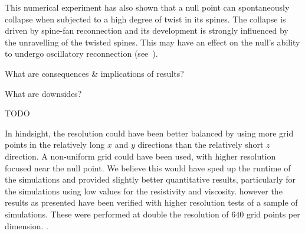 This numerical experiment has also shown that a null point can spontaneously collapse when subjected to a high degree of twist in its spines. The collapse is driven by spine-fan reconnection and its development is strongly influenced by the unravelling of the twisted spines. This may have an effect on the null's ability to undergo oscillatory reconnection (see~\cite{thurgoodThreedimensionalOscillatoryMagnetic2017}).

What are consequences \& implications of results?

What are downsides?

TODO

In hindsight, the resolution could have been better balanced by using more grid points in the relatively long $x$ and $y$ directions than the relatively short $z$ direction. A non-uniform grid could have been used, with higher resolution focused near the null point. We believe this would have sped up the runtime of the simulations and provided slightly better quantitative results, particularly for the simulations using low values for the resistivity and viscosity. however the results as presented have been verified with higher resolution tests of a sample of simulations. These were performed at double the resolution of $640$ grid points per dimension. .
